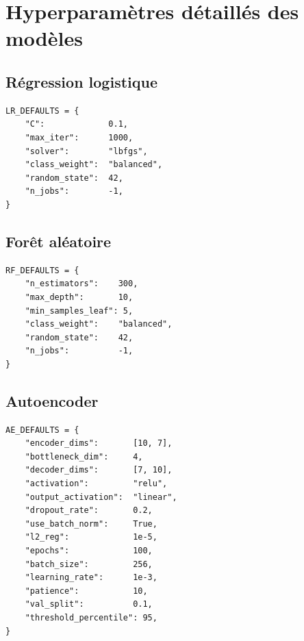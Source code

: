 \documentclass[12pt,a4paper,twoside]{report}
\begin{document}
\appendix

\chapter{Hyperparamètres détaillés des modèles}

\section{Régression logistique}

\begin{lstlisting}[caption={Hyperparamètres LR (ml\_core/models/ml\_models.py)},label={lst:lr_params}]
LR_DEFAULTS = {
    "C":             0.1,
    "max_iter":      1000,
    "solver":        "lbfgs",
    "class_weight":  "balanced",
    "random_state":  42,
    "n_jobs":        -1,
}
\end{lstlisting}

\section{Forêt aléatoire}

\begin{lstlisting}[caption={Hyperparamètres RF (ml\_core/models/ml\_models.py)},label={lst:rf_params}]
RF_DEFAULTS = {
    "n_estimators":    300,
    "max_depth":       10,
    "min_samples_leaf": 5,
    "class_weight":    "balanced",
    "random_state":    42,
    "n_jobs":          -1,
}
\end{lstlisting}

\section{Autoencoder}

\begin{lstlisting}[caption={Hyperparamètres AE (ml\_core/models/autoencoder.py)},label={lst:ae_params}]
AE_DEFAULTS = {
    "encoder_dims":       [10, 7],
    "bottleneck_dim":     4,
    "decoder_dims":       [7, 10],
    "activation":         "relu",
    "output_activation":  "linear",
    "dropout_rate":       0.2,
    "use_batch_norm":     True,
    "l2_reg":             1e-5,
    "epochs":             100,
    "batch_size":         256,
    "learning_rate":      1e-3,
    "patience":           10,
    "val_split":          0.1,
    "threshold_percentile": 95,
}
\end{lstlisting}
\end{document}
